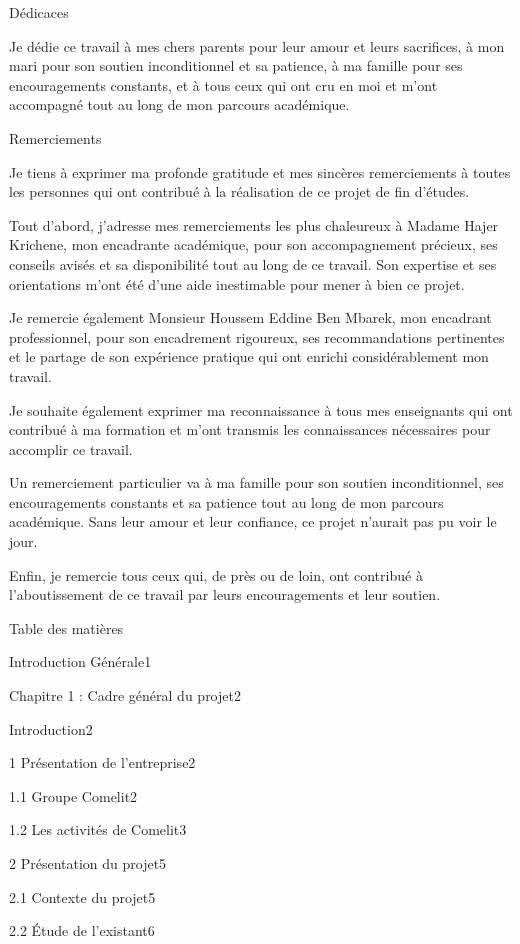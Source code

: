 \documentclass{article}
\begin{document}
Dédicaces

Je dédie ce travail à mes chers parents pour leur amour et leurs sacrifices, à mon mari pour son soutien inconditionnel et sa patience, à ma famille pour ses encouragements constants, et à tous ceux qui ont cru en moi et m'ont accompagné tout au long de mon parcours académique.

Remerciements

Je tiens à exprimer ma profonde gratitude et mes sincères remerciements à toutes les personnes qui ont contribué à la réalisation de ce projet de fin d'études.

Tout d'abord, j'adresse mes remerciements les plus chaleureux à Madame Hajer Krichene, mon encadrante académique, pour son accompagnement précieux, ses conseils avisés et sa disponibilité tout au long de ce travail. Son expertise et ses orientations m'ont été d'une aide inestimable pour mener à bien ce projet.

Je remercie également Monsieur Houssem Eddine Ben Mbarek, mon encadrant professionnel, pour son encadrement rigoureux, ses recommandations pertinentes et le partage de son expérience pratique qui ont enrichi considérablement mon travail.

Je souhaite également exprimer ma reconnaissance à tous mes enseignants qui ont contribué à ma formation et m'ont transmis les connaissances nécessaires pour accomplir ce travail.

Un remerciement particulier va à ma famille pour son soutien inconditionnel, ses encouragements constants et sa patience tout au long de mon parcours académique. Sans leur amour et leur confiance, ce projet n'aurait pas pu voir le jour.

Enfin, je remercie tous ceux qui, de près ou de loin, ont contribué à l'aboutissement de ce travail par leurs encouragements et leur soutien.

Table des matières

Introduction Générale1

Chapitre 1 : Cadre général du projet2

Introduction2

1 Présentation de l’entreprise2

1.1 Groupe Comelit2

1.2 Les activités de  Comelit3

2 Présentation du projet5

2.1 Contexte du projet5

2.2 Étude de l’existant6
\end{document}
